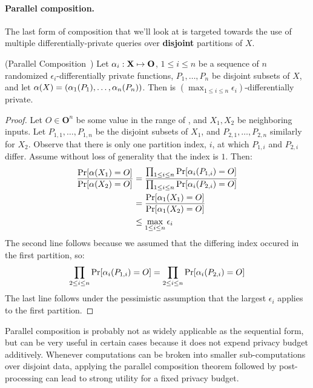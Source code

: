 \documentclass[11pt,twoside]{scrartcl}
\begin{document}
\paragraph{Parallel composition.} The last form of composition that we'll look at is targeted towards the use of multiple differentially-private queries over \textbf{disjoint} partitions of $X$.

\begin{theorem}{(Parallel Composition~\cite{McSherry2009})}
Let $\alpha_i : \mathbf{X} \mapsto \mathbf{O}$, $1 \le i \le n$ be a sequence of $n$ randomized $\epsilon_i$-differentially private functions, $P_1, \ldots, P_n$ be disjoint subsets of $X$, and let $\alpha(X) = (\alpha_1(P_1), \ldots, \alpha_n(P_n))$. Then \san is $(\max_{1 \le i \le n} \epsilon_i)$-differentially private.
\end{theorem}

\begin{proof}
Let $O \in \mathbf{O}^n$ be some value in the range of \san, and $X_1, X_2$ be neighboring inputs. Let $P_{1,1}, \ldots, P_{1,n}$ be the disjoint subsets of $X_1$, and $P_{2,1}, \ldots, P_{2,n}$ similarly for $X_2$. Observe that there is only one partition index, $i$, at which $P_{1,i}$ and $P_{2,i}$ differ. Assume without loss of generality that the index is $1$. Then:
\begin{align*}
\frac{
  \mathrm{Pr}[\alpha(X_1) = O]
}{
  \mathrm{Pr}[\alpha(X_2) = O]
}
&=
\frac{
  \prod_{1 \le i \le n} \mathrm{Pr}[\alpha_i(P_{1,i}) = O]
}{
  \prod_{1 \le i \le n} \mathrm{Pr}[\alpha_i(P_{2,i}) = O]
}
\\
&=
\frac{
  \mathrm{Pr}[\alpha_1(X_1) = O]
}{
  \mathrm{Pr}[\alpha_1(X_2) = O]
}
\\
&\le
\max_{1 \le i \le n} \epsilon_i
\end{align*}
The second line follows because we assumed that the differing index occured in the first partition, so:
\[
\prod_{2 \le i \le n} \mathrm{Pr}[\alpha_i(P_{1,i}) = O] = \prod_{2 \le i \le n} \mathrm{Pr}[\alpha_i(P_{2,i}) = O]
\]
The last line follows under the pessimistic assumption that the largest $\epsilon_i$ applies to the first partition.
\end{proof}

Parallel composition is probably not as widely applicable as the sequential form, but can be very useful in certain cases because it does not expend privacy budget additively. Whenever computations can be broken into smaller sub-computations over disjoint data, applying the parallel composition theorem followed by post-processing can lead to strong utility for a fixed privacy budget.



\end{document}
